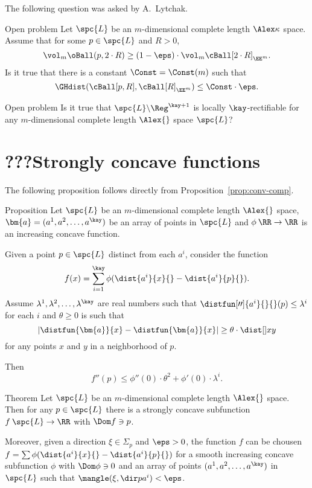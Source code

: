 The following question was asked by A.~Lytchak.

\begin{thm}{Open problem}
Let $\spc{L}$ be an $m$-dimensional complete length $\Alex\kappa$ space.
Assume that for some $p\in \spc{L}$ and $R>0$,
\[\vol_m\oBall(p,2\cdot R)\ge (1-\eps)\cdot\vol_m\cBall[2\cdot R]_{\EE^m}.\]
Is it true that there is a constant $\Const=\Const(m)$ such that
\[\GHdist(\cBall[p,R],\cBall[R]_{\EE^m})\le \Const\cdot\eps.\]
\end{thm}

\begin{thm}{Open problem}
Is it true that $\spc{L}\backslash\Reg^{\kay+1}$ 
is locally $\kay$-rectifiable for any $m$-dimensional complete length $\Alex{}$ space $\spc{L}$?
\end{thm}


\section{???Strongly concave functions}

The following proposition follows directly from Proposition~\ref{prop:conv-comp}.

\begin{thm}{Proposition}\label{prop:conv-comp-cbb}
Let $\spc{L}$ be an $m$-dimensional complete length $\Alex{}$ space, 
$\bm{a}=(a^1,a^2,\dots,a^\kay)$ be an array of points in $\spc{L}$
and $\phi\:\RR\to\RR$ is an increasing concave function.

Given a point $p\in \spc{L}$ distinct from each $a^i$,
 consider the function
$$f(x)=\sum_{i=1}^\kay\phi(\dist{a^i}{x}{}-\dist{a^i}{p}{}).$$
Assume $\lambda^1,\lambda^2,\dots,\lambda^\kay$ are real numbers such that
$\distfun[\prime\prime]{a^i}{}{}(p)\le\lambda^i$ for each $i$
and $\theta\ge 0$ is such that
$$|\distfun{\bm{a}}{x}-\distfun{\bm{a}}{x}|
\ge 
\theta\cdot\dist[{{}}]{x}{y}{}$$
for any points $x$ and $y$ in a neighborhood of $p$.

Then 
$$f''(p)\le \phi''(0)\cdot \theta^2+\phi'(0)\cdot\lambda^i.$$

\end{thm}


\begin{thm}{Theorem}\label{thm:concave-thereis}
Let $\spc{L}$ be an $m$-dimensional complete length $\Alex{}$ space.
Then for any $p\in\spc{L}$ there is a strongly concave subfunction $f\: \spc{L}\to\RR$ with
$\Dom f\ni p$.

Moreover, given a direction $\xi\in\Sigma_p$  and $\eps>0$,
the function $f$ can be chousen 
$f=\sum\phi(\dist{a^i}{x}{}-\dist{a^i}{p}{})$
for a smooth increasing concave subfunction $\phi$ with $\Dom \phi\ni0$
and an array of points $(a^1,a^2,\dots,a^\kay)$ in $\spc{L}$
such that $\mangle(\xi,\dir p{a^i})<\eps$. 
\end{thm}

